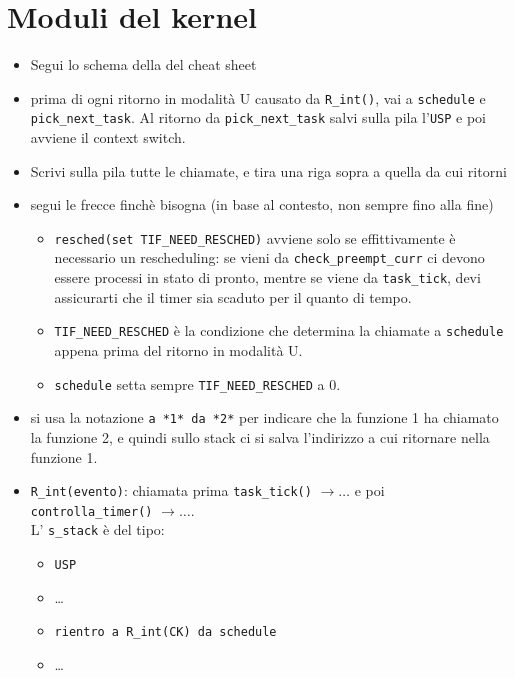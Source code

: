 \documentclass[12pt, a4paper]{report}
\begin{document}
\section*{Moduli del kernel}
\begin{itemize}
	\item Segui lo schema della del cheat sheet
	\item prima di ogni ritorno in modalità U causato da \texttt{R\_int()}, vai
	      a \texttt{schedule} e \texttt{pick\_next\_task}. Al ritorno da
	      \texttt{pick\_next\_task} salvi sulla pila l'\texttt{USP} e poi avviene
	      il context switch.
	\item Scrivi sulla pila tutte le chiamate, e tira una riga sopra a quella da
	      cui ritorni
	\item segui le frecce finchè bisogna (in base al contesto, non sempre fino
	      alla fine)
	      \begin{itemize}
		      \item \texttt{resched(set TIF\_NEED\_RESCHED)} avviene solo se
		            effittivamente è necessario un rescheduling: se vieni da
		            \texttt{check\_preempt\_curr} ci devono essere processi in
		            stato di pronto, mentre se viene da \texttt{task\_tick}, devi
		            assicurarti che il timer sia scaduto per il quanto di tempo.
		      \item \texttt{TIF\_NEED\_RESCHED} è la condizione che determina la
		            chiamate a \texttt{schedule} appena prima del ritorno in
		            modalità U.
		      \item \texttt{schedule} setta sempre \texttt{TIF\_NEED\_RESCHED} a
		            0.
	      \end{itemize}
	\item si usa la notazione \texttt{a *1* da *2*} per indicare che la funzione
	      1 ha chiamato la funzione 2, e quindi sullo stack ci si salva
	      l'indirizzo a cui ritornare nella funzione 1.
	\item \texttt{R\_int(evento)}: chiamata prima \texttt{task\_tick()} $\to
		      \dots$ e poi \texttt{controlla\_timer()} $\to \dots$.\\
	      L' \texttt{s\_stack} è del tipo:
	      \begin{itemize}
		      \item \texttt{USP}
		      \item \dots
		      \item \texttt{rientro a R\_int(CK) da schedule}
		      \item \dots

\end{itemize}
\end{itemize}
\end{document}
